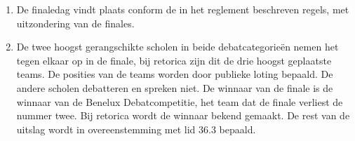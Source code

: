 
\begin{enumerate}
\item De finaledag vindt plaats conform de in het reglement beschreven regels, met uitzondering van de finales.
\item De twee hoogst gerangschikte scholen in beide debatcategorieën nemen het tegen elkaar op in de finale, bij retorica zijn dit de drie hoogst geplaatste teams. De posities van de teams worden door publieke loting bepaald. De andere scholen debatteren en spreken niet. De winnaar van de finale is de winnaar van de Benelux Debatcompetitie, het team dat de finale verliest de nummer twee. Bij retorica wordt de winnaar bekend gemaakt. De rest van de uitslag wordt in overeenstemming met lid 36.3 bepaald.
\end{enumerate}